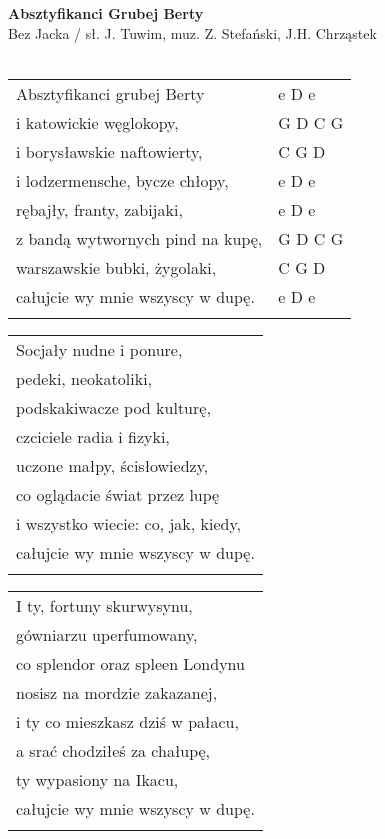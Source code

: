 \documentclass[a5paper]{article}
\begin{document}


\noindent
\fontsize{12pt}{15pt}\selectfont
\textbf{Absztyfikanci Grubej Berty} \\
\fontsize{8pt}{10pt}\selectfont
Bez Jacka / sł. J. Tuwim, muz. Z. Stefański, J.H. Chrząstek \\ \\
\fontsize{10pt}{12pt}\selectfont
{}
\begin{tabular}{@{}p{9.0cm}p{3cm}@{}}
\noindent
Absztyfikanci grubej Berty & e D e \\
i katowickie węglokopy, & G D C G \\
i borysławskie naftowierty, & C G D \\
i lodzermensche, bycze chłopy, & e D e \\
rębajły, franty, zabijaki, & e D e \\
z bandą wytwornych pind na kupę, & G D C G \\
warszawskie bubki, żygolaki, & C G D \\
całujcie wy mnie wszyscy w dupę. & e D e \\ \\
\end{tabular}

\noindent
\begin{tabular}{@{}p{9.5cm}@{}}
Socjały nudne i ponure, \\
pedeki, neokatoliki, \\
podskakiwacze pod kulturę, \\
czciciele radia i fizyki, \\
uczone małpy, ścisłowiedzy, \\
co oglądacie świat przez lupę \\
i wszystko wiecie: co, jak, kiedy, \\
całujcie wy mnie wszyscy w dupę. \\ \\
\end{tabular}

\noindent
\begin{tabular}{@{}p{9.5cm}@{}}
I ty, fortuny skurwysynu, \\
gówniarzu uperfumowany, \\
co splendor oraz spleen Londynu \\
nosisz na mordzie zakazanej, \\
i ty co mieszkasz dziś w pałacu, \\
a srać chodziłeś za chałupę, \\
ty wypasiony na Ikacu, \\
całujcie wy mnie wszyscy w dupę. \\ \\
\end{tabular}
\end{document}
